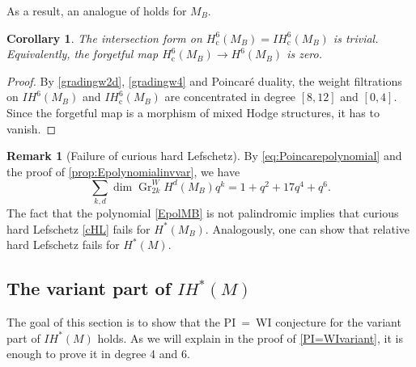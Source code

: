 \documentclass[JEP,XML,SOM,Unicode, NoEqCountersInSection,NoFloatCountersInSection,published]{cedram}
\newcommand{\cc}{\mathrm{c}}
\newcommand{\IH}{\mathit{IH}}
\newtheorem{cor}[thm]{Corollary}
\theoremstyle{definition}
\newtheorem{rmk}[thm]{Remark}
\newcommand{\Gr}{\operatorname{Gr}}
\begin{document}
As a result, an analogue of \cite[Cor.\,4.5.1]{HauselRodriguez-Villegas2008} holds for $M_B$.

\begin{cor}\label{vanishinginterform}
The intersection form on $H^6_{\cc}(M_B) = \IH^6_{\cc}(M_B)$ is trivial. Equivalently, the forgetful map $H^6_{\cc}(M_B) \to H^6(M_B)$ is zero.
\end{cor}

\begin{proof}
By \eqref{gradingw2d}, \eqref{gradingw4} and Poincaré duality, the weight filtrations on $\IH^6(M_B)$ and $\IH^6_{\cc}(M_B)$ are concentrated in degree $[8,12]$ and $[0,4]$. Since the forgetful map is a morphism of mixed Hodge structures, it has to vanish.
\end{proof}

\begin{rmk}[Failure of curious hard Lefschetz] \label{failurecurioushardLef}
By \eqref{eq:Poincarepolynomial} and the proof of \cref{prop:Epolynomialinvvar}, we have\vspace*{-3pt}
\begin{equation}\label{EpolMB}
\sum_{k, d} \dim \Gr^W_{2k}H^d(M_B) q^k = 1+q^2+17q^4+q^6.
\end{equation}
The fact that the polynomial \eqref{EpolMB} is not palindromic implies that curious hard Lefschetz \eqref{cHL} fails for $H^*(M_B)$. Analogously, one can show that relative hard Lefschetz fails for $H^*(M)$.
\end{rmk}

\subsection{The variant part of $\IH^{*}(M)$}\label{sec:The variant part}
The goal of this section is to show that the \hbox{PI = WI} conjecture for the variant part of $\IH^{*}(M)$ holds. As we will explain in the proof of \cref{PI=WIvariant}, it is enough to prove it in degree 4 and 6.
\end{document}
